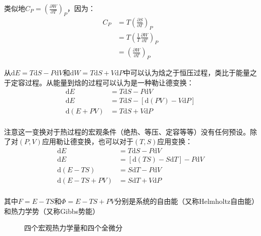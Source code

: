 \documentclass[UTF8]{ctexart}
\begin{document}
\begin{spacing}{2.0}
类似地$C_{P}=\left(\frac{\partial W}{\partial T} \right)_{P}$，因为：
\begin{equation}
\begin{aligned}
C_{P}&= T\left(\frac{\partial S}{\partial T}\right)_{P} \\
&= T\left(\frac{1}{T} \frac{\partial W}{\partial T} \right)_{P} \\
&= \left(\frac{\partial W}{\partial T} \right)_{P}
\end{aligned}
\end{equation}

从$\text{d}E=T\text{d}S-P\text{d}V$和$\text{d}W=T\text{d}S+V\text{d}P$中可以认为焓之于恒压过程，类比于能量之于定容过程。从能量到焓的过程可以认为是一种勒让德变换：
\begin{equation}
\begin{aligned}
\text{d}E &= T\text{d}S-P\text{d}V \\
\text{d}E &= T\text{d}S - \left[\text{d}(PV)-V\text{d}P \right]\\
\text{d}(E+PV)&=T\text{d}S+V\text{d}P \\
\end{aligned}
\end{equation}

注意这一变换对于热过程的宏观条件（绝热、等压、定容等等）没有任何预设。除了对$(P,V)$应用勒让德变换，也可以对于$(T,S)$应用变换：
\begin{equation}
\begin{aligned}
\text{d}E&=T\text{d}S-P\text{d}V\\
\text{d}E&=\left[\text{d}(TS)-S\text{d}T \right]-P\text{d}V \\
\text{d}(E-TS)&=S\text{d}T-P\text{d}V \\
\text{d}(E-TS+PV)&=S\text{d}T+V\text{d}P \\
\end{aligned}
\end{equation}

其中$F=E-TS$和$\Phi=E-TS+PV$分别是系统的自由能（又称Helmholtz自由能）和热力学势（又称Gibbs势能）
\begin{figure}[h]
\centering
{}
\caption{四个宏观热力学量和四个全微分}
\end{figure}


\end{spacing}
\end{document}

